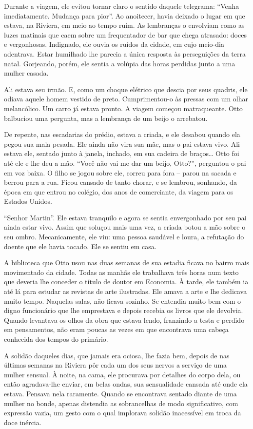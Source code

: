 Durante a viagem, ele evitou tornar claro o sentido daquele telegrama:
``Venha imediatamente. Mudança para pior''. Ao anoitecer, havia deixado
o lugar em que estava, na Riviera, em meio ao tempo ruim. As lembranças
o envolviam como as luzes matinais que caem sobre um frequentador de bar
que chega atrasado: doces e vergonhosas. Indignado, ele ouvia os ruídos
da cidade, em cujo meio-dia adentrava. Estar humilhado lhe parecia a
única resposta às perseguições da terra natal. Gorjeando, porém, ele
sentia a volúpia das horas perdidas junto a uma mulher casada.

Ali estava seu irmão. E, como um choque elétrico que descia por seus
quadris, ele odiava aquele homem vestido de preto. Cumprimentou-o às
pressas com um olhar melancólico. Um carro já estava pronto. A viagem
começou matraqueante. Otto balbuciou uma pergunta, mas a lembrança de um
beijo o arrebatou.

De repente, nas escadarias do prédio, estava a criada, e ele desabou
quando ela pegou sua mala pesada. Ele ainda não vira sua mãe, mas o pai
estava vivo. Ali estava ele, sentado junto à janela, inchado, em sua
cadeira de braços\ldots{} Otto foi até ele e lhe deu a mão. ``Você não vai me
dar um beijo, Otto?'', perguntou o pai em voz baixa. O filho se jogou
sobre ele, correu para fora -- parou na sacada e berrou para a rua.
Ficou cansado de tanto chorar, e se lembrou, sonhando, da época em que
entrou no colégio, dos anos de comerciante, da viagem para os Estados
Unidos.

``Senhor Martin''. Ele estava tranquilo e agora se sentia envergonhado
por seu pai ainda estar vivo. Assim que soluçou mais uma vez, a criada
botou a mão sobre o seu ombro. Mecanicamente, ele viu: uma pessoa
saudável e loura, a refutação do doente que ele havia tocado. Ele se
sentiu em casa.

A biblioteca que Otto usou nas duas semanas de sua estadia ficava no
bairro mais movimentado da cidade. Todas as manhãs ele trabalhava três
horas num texto que deveria lhe conceder o título de doutor em Economia.
À tarde, ele também ia até lá para estudar as revistas de arte
ilustradas. Ele amava a arte e lhe dedicava muito tempo. Naquelas salas,
não ficava sozinho. Se entendia muito bem com o digno funcionário que
lhe emprestava e depois recebia os livros que ele devolvia. Quando
levantava os olhos da obra que estava lendo, franzindo a testa e perdido
em pensamentos, não eram poucas as vezes em que encontrava uma cabeça
conhecida dos tempos do primário.

A solidão daqueles dias, que jamais era ociosa, lhe fazia bem, depois de
nas últimas semanas na Riviera pôr cada um dos seus nervos a serviço de
uma mulher sensual. À noite, na cama, ele procurava por detalhes do
corpo dela, ou então agradava-lhe enviar, em belas ondas, sua
sensualidade cansada até onde ela estava. Pensava nela raramente. Quando
se encontrava sentado diante de uma mulher no bonde, apenas distendia as
sobrancelhas de modo significativo, com expressão vazia, um gesto com o
qual implorava solidão inacessível em troca da doce inércia.

